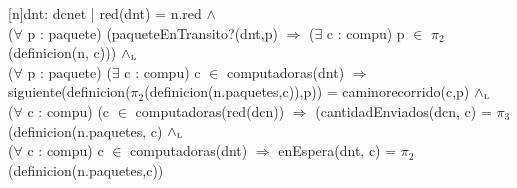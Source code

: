 \begin{Representacion}
 
  [n]{dnt: dcnet | red(dnt) = n.red  $\land$ \\
  																		($\forall$ p : paquete) (paqueteEnTransito?(dnt,p) $\Rightarrow$ ($\exists$ c : compu) p $\in$ $\pi_2$(definicion(n, c))) $\land_{\mathrm{\scriptscriptstyle{L}}}$\\
  																		($\forall$ p : paquete) ($\exists$ c : compu) c $\in$ computadoras(dnt) $\Rightarrow$\\
  																		\hspace*{2em} siguiente(definicion($\pi_2$(definicion(n.paquetes,c)),p)) = caminorecorrido(c,p)  $\land_{\mathrm{\scriptscriptstyle{L}}}$\\
  																		($\forall$ c : compu) (c $\in$ computadoras(red(dcn)) $\Rightarrow$ (cantidadEnviados(dcn, c) = $\pi_3$(definicion(n.paquetes, c) $\land_{\mathrm{\scriptscriptstyle{L}}}$ \\
  																		($\forall$ c : compu) c $\in$ computadoras(dnt) $\Rightarrow$ enEspera(dnt, c) = $\pi_2$(definicion(n.paquetes,c))}

\end{Representacion}


